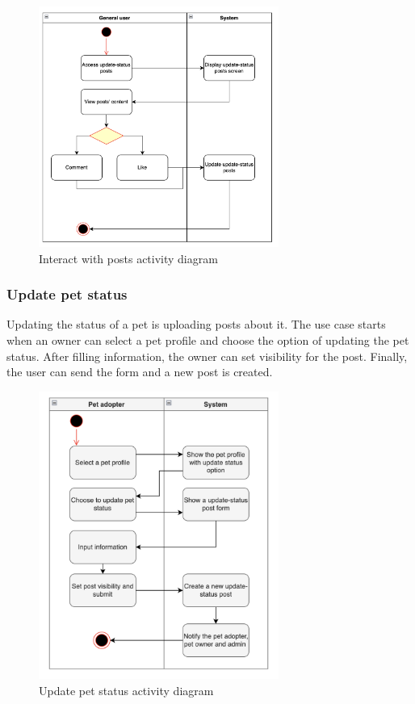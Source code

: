 \begin{figure}[H]
  \centering
  \includegraphics[width=0.7\textwidth]{Figures/post_interact.png}
  \caption{Interact with posts activity diagram}
  \label{fig:interact-post}
\end{figure}


\subsubsection{Update pet status}

Updating the status of a pet is uploading posts about it. The use case starts when an owner can select a pet profile and choose the option of updating the pet status. After filling information, the owner can set visibility for the post. Finally, the user can send the form and a new post is created.

\begin{figure}[H]
  \centering
  \includegraphics[width=0.7\textwidth]{Figures/pet_status.png}
  \caption{Update pet status activity diagram}
  \label{fig:update-pet-status}
\end{figure}


